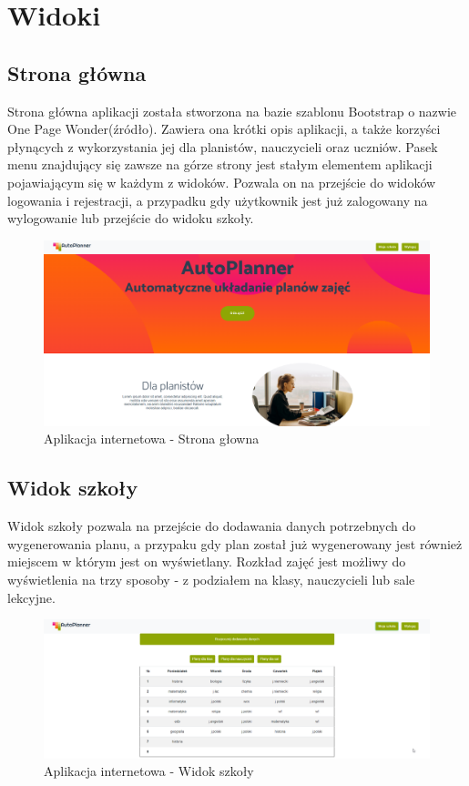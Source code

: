\section{Widoki}
\subsection{Strona główna}
Strona główna aplikacji została stworzona na bazie szablonu Bootstrap o nazwie One Page Wonder(źródło). Zawiera ona krótki opis aplikacji, a także korzyści płynących z wykorzystania jej dla planistów, nauczycieli oraz uczniów. Pasek menu znajdujący się zawsze na górze strony jest stałym elementem aplikacji pojawiającym się w każdym z widoków. Pozwala on na przejście do widoków logowania i rejestracji, a przypadku gdy użytkownik jest już zalogowany na wylogowanie lub przejście do widoku szkoły. 
\begin{figure}[t]
\centering\includegraphics[width=\textwidth]{figures/main}
\caption{Aplikacja internetowa - Strona głowna}\label{rys:main}
\end{figure}
\subsection{Widok szkoły}
Widok szkoły pozwala na przejście do dodawania danych potrzebnych do wygenerowania planu, a przypaku gdy plan został już wygenerowany jest również miejscem w którym jest on wyświetlany. Rozkład zajęć jest możliwy do wyświetlenia na trzy sposoby - z podziałem na klasy, nauczycieli lub sale lekcyjne.
\begin{figure}[t]
\centering\includegraphics[width=\textwidth]{figures/school}
\caption{Aplikacja internetowa - Widok szkoły}\label{rys:school}
\end{figure}
